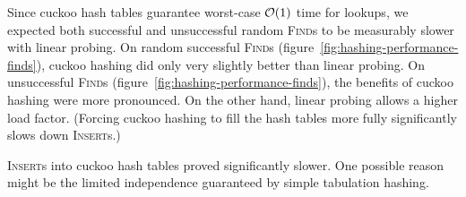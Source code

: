 Since cuckoo hash tables guarantee worst-case $\mathcal{O}(1)$ time for lookups,
we expected both successful and unsuccessful random \textsc{Find}s to be
measurably slower with linear probing.
On random successful \textsc{Find}s (figure~\ref{fig:hashing-performance-finds}),
cuckoo hashing did only very slightly better than linear probing.
On unsuccessful \textsc{Find}s (figure~\ref{fig:hashing-performance-finds}),
the benefits of cuckoo hashing were more pronounced.
On the other hand, linear probing allows a higher load factor.
(Forcing cuckoo hashing to fill the hash tables more fully significantly
slows down \textsc{Insert}s.)

\textsc{Insert}s into cuckoo hash tables proved significantly slower.
One possible reason might be the limited independence guaranteed by simple
tabulation hashing.

